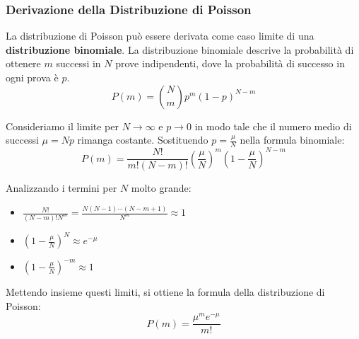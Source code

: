 \subsubsection{Derivazione della Distribuzione di Poisson}

La distribuzione di Poisson può essere derivata come caso limite di una \textbf{distribuzione binomiale}. La distribuzione binomiale descrive la probabilità di ottenere $m$ successi in $N$ prove indipendenti, dove la probabilità di successo in ogni prova è $p$.
$$P(m) = \binom{N}{m} p^m (1-p)^{N-m}$$

Consideriamo il limite per $N \to \infty$ e $p \to 0$ in modo tale che il numero medio di successi $\mu = Np$ rimanga costante.
Sostituendo $p = \frac{\mu}{N}$ nella formula binomiale:
$$P(m) = \frac{N!}{m!(N-m)!} \left(\frac{\mu}{N}\right)^m \left(1-\frac{\mu}{N}\right)^{N-m}$$

Analizzando i termini per $N$ molto grande:
\begin{itemize}
    \item $\frac{N!}{ (N-m)! N^m } = \frac{N(N-1)\cdots(N-m+1)}{N^m} \approx 1$
    \item $\left(1-\frac{\mu}{N}\right)^N \approx e^{-\mu}$
    \item $\left(1-\frac{\mu}{N}\right)^{-m} \approx 1$
\end{itemize}

Mettendo insieme questi limiti, si ottiene la formula della distribuzione di Poisson:
$$P(m) = \frac{\mu^m e^{-\mu}}{m!}$$


